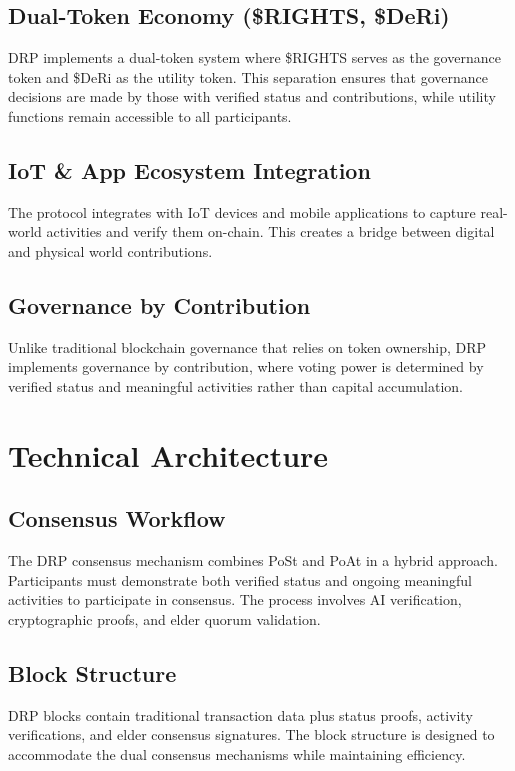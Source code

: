 \documentclass[11pt,a4paper]{article}
\begin{document}
\subsection{Dual-Token Economy (\$RIGHTS, \$DeRi)}
DRP implements a dual-token system where \$RIGHTS serves as the governance token and \$DeRi as the utility token. This separation ensures that governance decisions are made by those with verified status and contributions, while utility functions remain accessible to all participants.

\subsection{IoT \& App Ecosystem Integration}
The protocol integrates with IoT devices and mobile applications to capture real-world activities and verify them on-chain. This creates a bridge between digital and physical world contributions.

\subsection{Governance by Contribution}
Unlike traditional blockchain governance that relies on token ownership, DRP implements governance by contribution, where voting power is determined by verified status and meaningful activities rather than capital accumulation.


\section{Technical Architecture}

\subsection{Consensus Workflow}
The DRP consensus mechanism combines PoSt and PoAt in a hybrid approach. Participants must demonstrate both verified status and ongoing meaningful activities to participate in consensus. The process involves AI verification, cryptographic proofs, and elder quorum validation.

\subsection{Block Structure}
DRP blocks contain traditional transaction data plus status proofs, activity verifications, and elder consensus signatures. The block structure is designed to accommodate the dual consensus mechanisms while maintaining efficiency.
\end{document}
